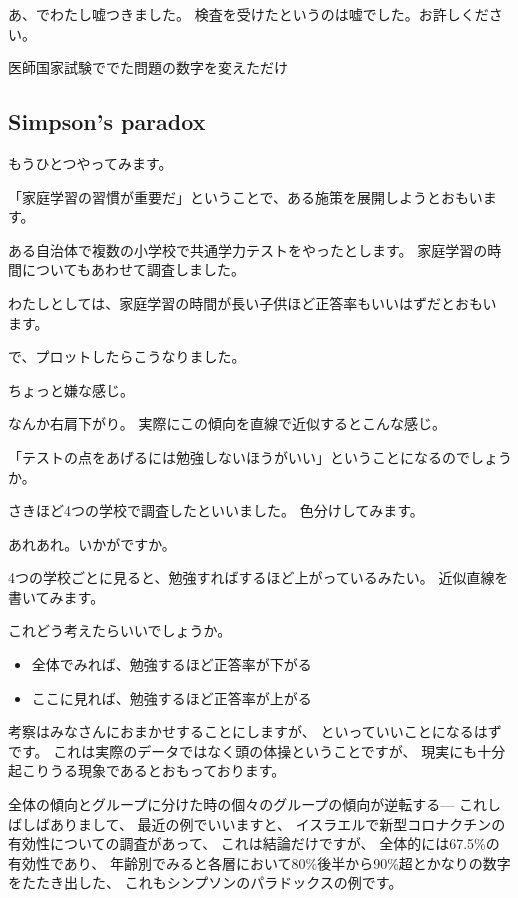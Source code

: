 \documentclass[uplatex,jis2004,dvipdfmx,12pt]{jsarticle}
\begin{document}
あ、でわたし嘘つきました。
検査を受けたというのは嘘でした。お許しください。

医師国家試験ででた問題の数字を変えただけ


\subsection{Simpson's paradox}
もうひとつやってみます。



「家庭学習の習慣が重要だ」ということで、ある施策を展開しようとおもいます。

ある自治体で複数の小学校で共通学力テストをやったとします。
家庭学習の時間についてもあわせて調査しました。

わたしとしては、家庭学習の時間が長い子供ほど正答率もいいはずだとおもい
ます。

で、プロットしたらこうなりました。

ちょっと嫌な感じ。

なんか右肩下がり。
実際にこの傾向を直線で近似するとこんな感じ。

「テストの点をあげるには勉強しないほうがいい」ということになるのでしょう
か。


さきほど4つの学校で調査したといいました。
色分けしてみます。

あれあれ。いかがですか。

4つの学校ごとに見ると、勉強すればするほど上がっているみたい。
近似直線を書いてみます。

これどう考えたらいいでしょうか。

\begin{itemize}
 \item 全体でみれば、勉強するほど正答率が下がる
 \item ここに見れば、勉強するほど正答率が上がる
\end{itemize}
考察はみなさんにおまかせすることにしますが、
といっていいことになるはずです。
これは実際のデータではなく頭の体操ということですが、
現実にも十分起こりうる現象であるとおもっております。

全体の傾向とグループに分けた時の個々のグループの傾向が逆転する---
これしばしばありまして、
最近の例でいいますと、
イスラエルで新型コロナクチンの有効性についての調査があって、
これは結論だけですが、
全体的には67.5\%の有効性であり、
年齢別でみると各層において80\%後半から90\%超とかなりの数字をたたき出した、
これもシンプソンのパラドックスの例です。
\end{document}

